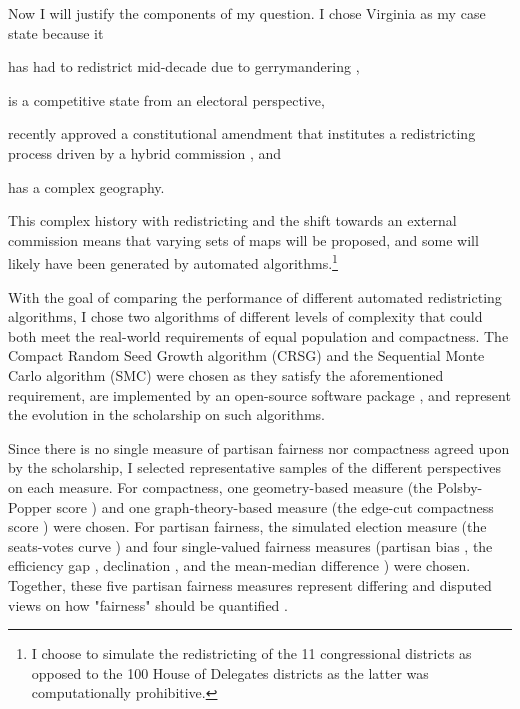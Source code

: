Now I will justify the components of my question. I chose Virginia as my case state because it 
\begin{seriate}
    \item has had to redistrict mid-decade due to gerrymandering \parencite[see][]{2016a},
    \item is a competitive state from an electoral perspective, 
    \item recently approved a constitutional amendment that institutes a redistricting process driven by a hybrid commission \parencite{ballotpediastaff2020}, and
    \item has a complex geography.
\end{seriate}
This complex history with redistricting and the shift towards an external commission means that varying sets of maps will be proposed, and some will likely have been generated by automated algorithms.\footnote{I choose to simulate the redistricting of the 11 congressional districts as opposed to the 100 House of Delegates districts as the latter was computationally prohibitive.}

With the goal of comparing the performance of different automated redistricting algorithms, I chose two algorithms of different levels of complexity that could both meet the real-world requirements of equal population and compactness. The Compact Random Seed Growth algorithm (CRSG) \parencite{chen2013} and the Sequential Monte Carlo algorithm (SMC) \parencite{mccartan2020} were chosen as they satisfy the aforementioned requirement, are implemented by an open-source software package \parencite{fifield2020d}, and represent the evolution in the scholarship on such algorithms. 

Since there is no single measure of partisan fairness nor compactness agreed upon by the scholarship, I selected representative samples of the different perspectives on each measure. For compactness, one geometry-based measure (the Polsby-Popper score \parencite{polsby1991}) and one graph-theory-based measure (the edge-cut compactness score \parencite{dube2016}) were chosen. For partisan fairness, the simulated election measure (the seats-votes curve \parencite{tufte1973}) and four single-valued fairness measures (partisan bias \parencite{katz2020}, the efficiency gap \parencite{stephanopoulos2014}, declination \parencite{warrington2018}, and the mean-median difference \parencite{mcdonald2015}) were chosen. Together, these five partisan fairness measures represent differing and disputed views on how "fairness" should be quantified \parencite{katz2020}. 

